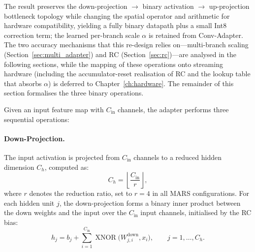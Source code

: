 \documentclass[12pt, a4paper]{report}
\numberwithin{equation}{chapter}
\numberwithin{figure}{chapter}
\numberwithin{table}{chapter}
\numberwithin{algorithm}{chapter}
\begin{document}
The result preserves the down-projection $\to$ binary activation $\to$ up-projection bottleneck topology while changing the spatial operator and arithmetic for hardware compatibility, yielding a fully binary datapath plus a small Int8 correction term; the learned per-branch scale $\alpha$ is retained from Conv-Adapter. The two accuracy mechanisms that this re-design relies on---multi-branch scaling (Section~\ref{sec:multi_adapter}) and RC (Section~\ref{sec:rc})---are analysed in the following sections, while the mapping of these operations onto streaming hardware (including the accumulator-reset realisation of RC and the lookup table that absorbs $\alpha$) is deferred to Chapter~\ref{ch:hardware}. The remainder of this section formalises the three binary operations.

Given an input feature map with $C_{\text{in}}$ channels, the adapter performs three sequential operations:

\paragraph{Down-Projection.} The input activation is projected from $C_{\text{in}}$ channels to a reduced hidden dimension $C_h$, computed as:
\begin{equation}
C_h = \left\lfloor \frac{C_{\text{in}}}{r} \right\rfloor,
\label{eq:hidden_dim}
\end{equation}
where $r$ denotes the reduction ratio, set to $r = 4$ in all MARS configurations. For each hidden unit $j$, the down-projection forms a binary inner product between the down weights and the input over the $C_{\text{in}}$ input channels, initialised by the RC bias:
\begin{equation}
h_j = b_j + \sum_{i=1}^{C_{\text{in}}} \operatorname{XNOR}\bigl(W^{\text{down}}_{j,i}, x_i\bigr), \qquad j = 1, \ldots, C_h.
\label{eq:down_proj}
\end{equation}
\end{document}
